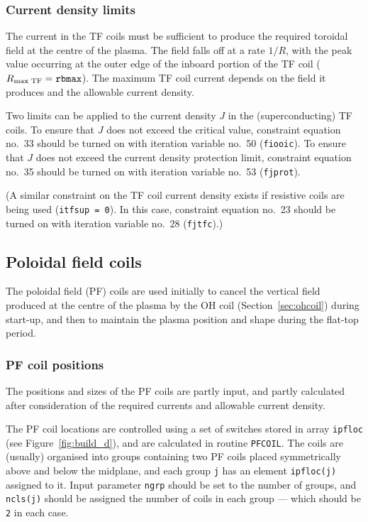 \documentclass[11pt,a4paper]{report}
\begin{document}
\subsubsection{Current density limits}

The current in the TF coils must be sufficient to produce the required
toroidal field at the centre of the plasma. The field falls off at a rate
$1/R$, with the peak value occurring at the outer edge of the inboard portion
of the TF coil ($R_{\mbox{\scriptsize max TF}} = \mathtt{rbmax}$). The maximum
TF coil current depends on the field it produces and the allowable current
density.

Two limits can be applied to the current density $J$ in the (superconducting)
TF coils. To ensure that $J$ does not exceed the critical value, constraint
equation no.\ 33 should be turned on with iteration variable no.\ 50
(\texttt{fiooic}). To ensure that $J$ does not exceed the current density
protection limit, constraint equation no.\ 35 should be turned on with
iteration variable no.\ 53 (\texttt{fjprot}).

(A similar constraint on the TF coil current density exists if resistive coils
are being used (\texttt{itfsup = 0}). In this case, constraint equation no.\ 23
should be turned on with iteration variable no.\ 28 (\texttt{fjtfc}).)

\subsection{Poloidal field coils}
\label{sec:pfcoils}

The poloidal field (PF) coils are used initially to cancel the vertical field
produced at the centre of the plasma by the OH coil (Section~\ref{sec:ohcoil})
during start-up, and then to maintain the plasma position and shape during the
flat-top period.

\subsubsection{PF coil positions}

The positions and sizes of the PF coils are partly input, and partly
calculated after consideration of the required currents and allowable current
density.

The PF coil locations are controlled using a set of switches stored in array
\texttt{ipfloc} (see Figure~\ref{fig:build_d}), and are calculated in routine
\texttt{PFCOIL}. The coils are (usually) organised into groups containing two
PF coils placed symmetrically above and below the midplane, and each group
\texttt{j} has an element \texttt{ipfloc(j)} assigned to it. Input parameter
\texttt{ngrp} should be set to the number of groups, and \texttt{ncls(j)}
should be assigned the number of coils in each group --- which should be
\texttt{2} in each case.
\end{document}
